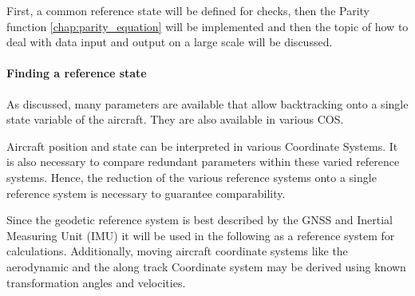 First, a common reference state will be defined for checks, then the Parity function \ref{chap:parity_equation} will be implemented and then the topic of how to deal with data input and output on a large scale will be discussed.

\paragraph{Finding a reference state}

As discussed, many parameters are available that allow backtracking onto a single state variable of the aircraft. They are also available in various COS.

Aircraft position and state can be interpreted in various Coordinate Systems. It is also necessary to compare redundant parameters within these varied reference systems. Hence, the reduction of the various reference systems onto a single reference system is necessary to guarantee comparability.

Since the geodetic reference system is best described by the GNSS and Inertial Measuring Unit (IMU) it will be used in the following as a reference system for calculations. Additionally, moving aircraft coordinate systems like the aerodynamic and the along track Coordinate system may be derived using known transformation angles and velocities. \cite{brockhaus_flugregelung_2011}




